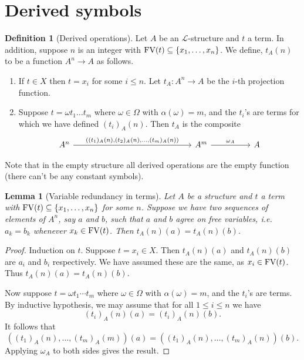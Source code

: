 \documentclass{report}
\theoremstyle{definition}
\theoremstyle{plain}
\newtheorem{lem}[thm]{Lemma}
\theoremstyle{definition}
\newtheorem{defn}[thm]{Definition}
\begin{document}
	\section{Derived symbols}
	\begin{defn}[Derived operations]
		Let $A$ be an $\mathcal{L}$-structure and $t$ a term. In addition, suppose $n$ is an integer with $\textnormal{FV}(t) \subseteq \{x_1,\ldots,x_n\}$. We define, $t_A(n)$ to be a function $A^{n} \to A$ as follows.
		\begin{enumerate}
			\item If $t\in X$ then $t = x_i$ for some $i\leq n$. Let $t_A\colon A^n \to A$ be the $i$-th projection function.
			\item Suppose $t = \omega t_1\ldots t_m$ where $\omega \in \Omega$ with $\alpha(\omega) = m$, and the $t_i$'s are terms for which we have defined $(t_i)_A(n)$. Then $t_A$ is the composite 
			\[\begin{tikzcd}[column sep=huge]
				{A^n} &&& {A^m} & A
				\arrow["{\omega_A}", from=1-4, to=1-5]
				\arrow["{((t_1)_A(n),(t_2)_A(n),\ldots, (t_m)_A(n))}", from=1-1, to=1-4]
			\end{tikzcd}\]		
		\end{enumerate}
	\end{defn}
	Note that in the empty structure all derived operations are the empty function (there can't be any constant symbols).
	\begin{lem}[Variable redundancy in terms]\label{lem:redun_terms}
		Let $A$ be a structure and $t$ a term with $\textnormal{FV}(t) \subseteq \{x_1,\ldots,x_n\}$ for some $n$. Suppose we have two sequences of elements of $A^n$, say $a$ and $b$, such that $a$ and $b$ agree on free variables, i.e. $a_k = b_k$ whenever $x_k\in \textnormal{FV}(t)$. Then $t_A(n)(a) = t_A(n)(b)$.
	\end{lem}
	\begin{proof}
		Induction on $t$. Suppose $t = x_i\in X$. Then $t_A(n)(a)$ and $t_A(n)(b)$ are $a_i$ and $b_i$ respectively. We have assumed these are the same, as $x_i\in \textnormal{FV}(t)$. Thus $t_A(n)(a)= t_A(n)(b)$.
		
		Now suppose $t = \omega t_1 \cdots t_m$ where $\omega \in \Omega$ with $\alpha(\omega) = m$, and the $t_i$'s are terms. By inductive hypothesis, we may assume that for all $1\leq i \leq n$ we have
		\[
		(t_i)_A(n) (a) =  (t_i)_A(n) (b). 
		\]
		It follows that 
		\[
		((t_1)_A(n),\ldots, (t_m)_A(m))(a) = ((t_1)_A(n),\ldots, (t_m)_A(n))(b).
		\]
		Applying $\omega_A$ to both sides gives the result.
	\end{proof}
\end{document}
